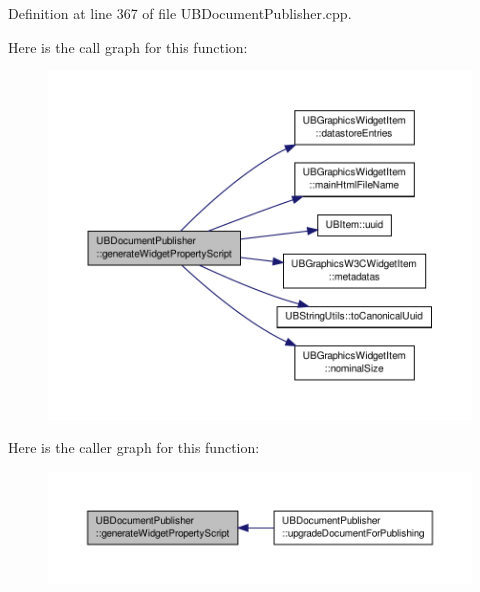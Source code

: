 Definition at line 367 of file U\-B\-Document\-Publisher.\-cpp.



Here is the call graph for this function\-:
\nopagebreak
\begin{figure}[H]
\begin{center}
\leavevmode
\includegraphics[width=350pt]{da/d3c/class_u_b_document_publisher_a2d09d6489998e64dbd774d3aa1d1dab3_cgraph}
\end{center}
\end{figure}




Here is the caller graph for this function\-:
\nopagebreak
\begin{figure}[H]
\begin{center}
\leavevmode
\includegraphics[width=350pt]{da/d3c/class_u_b_document_publisher_a2d09d6489998e64dbd774d3aa1d1dab3_icgraph}
\end{center}
\end{figure}


